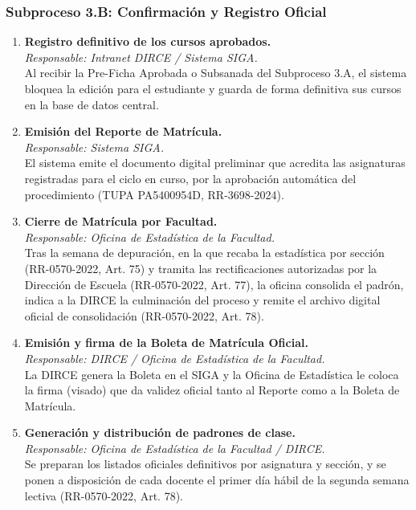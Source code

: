 \subsubsection{Subproceso 3.B: Confirmación y Registro Oficial}

\begin{enumerate}
    \item \textbf{Registro definitivo de los cursos aprobados.} \\
    \textit{Responsable: Intranet DIRCE / Sistema SIGA.} \\
    Al recibir la Pre-Ficha Aprobada o Subsanada del Subproceso 3.A, el sistema bloquea la edición para el estudiante y guarda de forma definitiva sus cursos en la base de datos central.

    \item \textbf{Emisión del Reporte de Matrícula.} \\
    \textit{Responsable: Sistema SIGA.} \\
    El sistema emite el documento digital preliminar que acredita las asignaturas registradas para el ciclo en curso, por la aprobaci\'on autom\'atica del procedimiento (TUPA PA5400954D, RR-3698-2024).

    \item \textbf{Cierre de Matr\'icula por Facultad.} \\
    \textit{Responsable: Oficina de Estad\'istica de la Facultad.} \\
    Tras la semana de depuraci\'on, en la que recaba la estad\'istica por secci\'on (RR-0570-2022, Art. 75\textdegree{}) y tramita las rectificaciones autorizadas por la Direcci\'on de Escuela (RR-0570-2022, Art. 77\textdegree{}), la oficina consolida el padr\'on, indica a la DIRCE la culminaci\'on del proceso y remite el archivo digital oficial de consolidaci\'on (RR-0570-2022, Art. 78\textdegree{}).

    \item \textbf{Emisión y firma de la Boleta de Matrícula Oficial.} \\
    \textit{Responsable: DIRCE / Oficina de Estadística de la Facultad.} \\
    La DIRCE genera la Boleta en el SIGA y la Oficina de Estadística le coloca la firma (visado) que da validez oficial tanto al Reporte como a la Boleta de Matrícula.

    \item \textbf{Generaci\'on y distribuci\'on de padrones de clase.} \\
    \textit{Responsable: Oficina de Estad\'istica de la Facultad / DIRCE.} \\
    Se preparan los listados oficiales definitivos por asignatura y secci\'on, y se ponen a disposici\'on de cada docente el primer d\'ia h\'abil de la segunda semana lectiva (RR-0570-2022, Art. 78\textdegree{}).


\end{enumerate}
